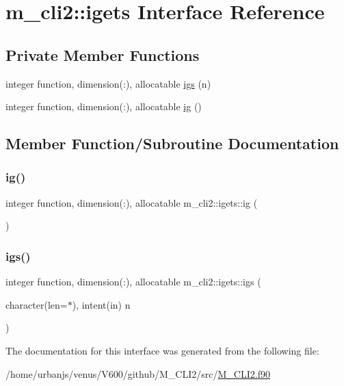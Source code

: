 \hypertarget{interfacem__cli2_1_1igets}{}\section{m\+\_\+cli2\+:\+:igets Interface Reference}
\label{interfacem__cli2_1_1igets}
\subsection*{Private Member Functions}
\begin{DoxyCompactItemize}
\item 
integer function, dimension(\+:), allocatable \mbox{\hyperlink{interfacem__cli2_1_1igets_a43c2f378ccfdb54607c53eb07dd6646d}{igs}} (n)
\item 
integer function, dimension(\+:), allocatable \mbox{\hyperlink{interfacem__cli2_1_1igets_ab0a792ab806198666db5ddc97457f660}{ig}} ()
\end{DoxyCompactItemize}


\subsection{Member Function/\+Subroutine Documentation}
\mbox{\label{interfacem__cli2_1_1igets_ab0a792ab806198666db5ddc97457f660}} 
\subsubsection{\texorpdfstring{ig()}{ig()}}
{\footnotesize\ttfamily integer function, dimension(\+:), allocatable m\+\_\+cli2\+::igets\+::ig (\begin{DoxyParamCaption}{ }\end{DoxyParamCaption})\hspace{0.3cm}{\ttfamily [private]}}

\mbox{\label{interfacem__cli2_1_1igets_a43c2f378ccfdb54607c53eb07dd6646d}} 
\subsubsection{\texorpdfstring{igs()}{igs()}}
{\footnotesize\ttfamily integer function, dimension(\+:), allocatable m\+\_\+cli2\+::igets\+::igs (\begin{DoxyParamCaption}\item[{character(len=$\ast$), intent(in)}]{n }\end{DoxyParamCaption})\hspace{0.3cm}{\ttfamily [private]}}



The documentation for this interface was generated from the following file\+:\begin{DoxyCompactItemize}
\item 
/home/urbanjs/venus/\+V600/github/\+M\+\_\+\+C\+L\+I2/src/\mbox{\hyperlink{M__CLI2_8f90}{M\+\_\+\+C\+L\+I2.\+f90}}\end{DoxyCompactItemize}
